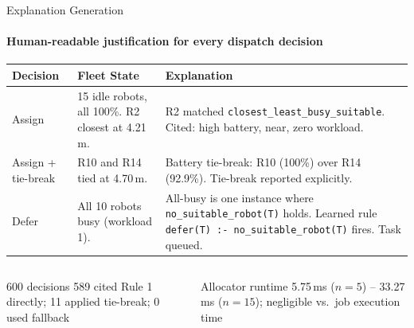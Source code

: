 \documentclass[aspectratio=169]{beamer}
\begin{document}
\begin{frame}[shrink=15]{Explanation Generation}
  \framesubtitle{Human-readable justification for every dispatch decision}
  \footnotesize
  \begin{table}
    \begin{tabularx}{\textwidth}{lXX}
      \textbf{Decision} & \textbf{Fleet State} & \textbf{Explanation} \\
      \toprule
      Assign &
        15 idle robots, all 100\%. R2 closest at 4.21\,m. &
        R2 matched \texttt{closest\_least\_busy\_suitable}.
        Cited: high battery, near, zero workload. \\
      \midrule
      Assign + tie-break &
        R10 and R14 tied at 4.70\,m. &
        Battery tie-break: R10 (100\%) over R14 (92.9\%).
        Tie-break reported explicitly. \\
      \midrule
      Defer &
        All 10 robots busy (workload 1). &
        All-busy is one instance where \texttt{no\_suitable\_robot(T)} holds.
        Learned rule \texttt{defer(T) :- no\_suitable\_robot(T)} fires. Task queued. \\
      \bottomrule
    \end{tabularx}
  \end{table}
  \vspace{0.2em}
  \begin{columns}[onlytextwidth]
      \begin{block}{600 decisions}
        589 cited Rule 1 directly; 11 applied tie-break; 0 used fallback
      \end{block}
      \begin{block}{Allocator runtime}
        5.75\,ms ($n=5$) -- 33.27\,ms ($n=15$); negligible vs.\ job execution time
      \end{block}
  \end{columns}
\end{frame}
\end{document}
